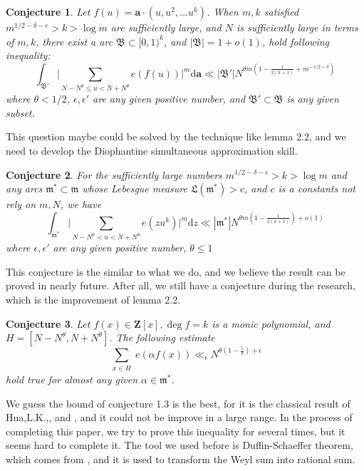 \documentclass[10pt]{article}
\newtheorem{conjecture}{Conjecture}[section]
\begin{document}
\begin{conjecture}
Let $f(u)=\textbf{a}\cdot(u,u^2,...u^k)$. When $m,k$ satisfied $m^{1/2-\delta-\epsilon}>k>\log m$ are sufficiently large, and $N$ is sufficiently large in terms of $m,k$, there exist a arc $\mathfrak{B}\subset[0,1)^k$, and $|\mathfrak{B}|=1+o(1)$, hold following inequality:
\[
\int_\mathfrak{B'}\Big|\sum\limits_{N-N^\theta\leq u< N+N^\theta}e(f(u))\Big|^m\mathrm{d}\mathbf{a}\ll |\mathfrak{B'}|N^{\theta m(1-\frac{1}{2(k+1)}+m^{-1/2-\delta})}
\]
where $\theta<1/2$, $\epsilon,\epsilon'$ are any given positive number, and $\mathfrak{B'}\subset\mathfrak{B}$ is any given subset.
\end{conjecture}
This question maybe could be solved by the technique like lemma 2.2, and we need to develop the Diophantine simultaneous approximation skill.
\begin{conjecture}
For the sufficiently large numbers $m^{1/2-\delta-\epsilon}>k>\log m$ and any arcs $\mathfrak{m^*}\subset\mathfrak{m}$ whose Lebesgue measure $\mathfrak{L}(\mathfrak{m^*})>c$, and $c$ is a constants not rely on $m,N$, we have
\[
\int_{\mathfrak{m^*}}\bigg|\sum\limits_{{N-N^\theta}<u<{N+N^\theta}}{e(zu^k)}\bigg|^{m}\mathrm{d}z
\ll|\mathfrak{m^*}|N^{\theta m(1-\frac{1}{2(k+1)})+o(1)}
\]
where $\epsilon,\epsilon'$ are any given positive number, $\theta\leq1$
\end{conjecture}
This conjecture is the similar to what we do, and we believe the result can be proved in nearly future. After all, we still have a conjecture during the research, which is the improvement of lemma 2.2.
\begin{conjecture}
Let $f(x)\in\textbf{Z}[x],\deg f=k$ is a monic polynomial, and $H=[N-N^\theta,N+N^\theta]$. The following estimate
\[
\sum\limits_{\substack{x\in H}}e(\alpha f(x))\ll_\epsilon N^{\theta(1-\frac{1}{k})+\epsilon}
\]
hold true for almost any given $\alpha\in\mathfrak{m^*}$.
\end{conjecture}
We guess the bound of conjecture 1.3 is the best, for it is the classical result of Hua,L.K.,\cite{Hua1963},\cite{PP1986} and \cite{Weil1948}, and it could not be improve in a large range. In the process of completing this paper, we try to prove this inequality for several times, but it seems hard to complete it. The tool we used before is Duffin-Schaeffer theorem, which comes from \cite{koukoulopoulos2024sharpquantitativeversionduffinschaeffer}, and it is used to transform the Weyl sum into rational sum.
\end{document}
